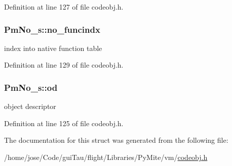 Definition at line 127 of file codeobj.\-h.

\hypertarget{struct_pm_no__s_ae4a0895de1ab9eb9198e3c762b7a811e}{
\subsubsection[{no\-\_\-funcindx}]{ Pm\-No\-\_\-s\-::no\-\_\-funcindx}}\label{struct_pm_no__s_ae4a0895de1ab9eb9198e3c762b7a811e}
index into native function table 

Definition at line 129 of file codeobj.\-h.

\hypertarget{struct_pm_no__s_ae78506fdb4937e7dd193add6fe7204bd}{
\subsubsection[{od}]{ Pm\-No\-\_\-s\-::od}}\label{struct_pm_no__s_ae78506fdb4937e7dd193add6fe7204bd}
object descriptor 

Definition at line 125 of file codeobj.\-h.



The documentation for this struct was generated from the following file\-:\begin{DoxyCompactItemize}
\item 
/home/jose/\-Code/gui\-Tau/flight/\-Libraries/\-Py\-Mite/vm/\hyperlink{codeobj_8h}{codeobj.\-h}\end{DoxyCompactItemize}
